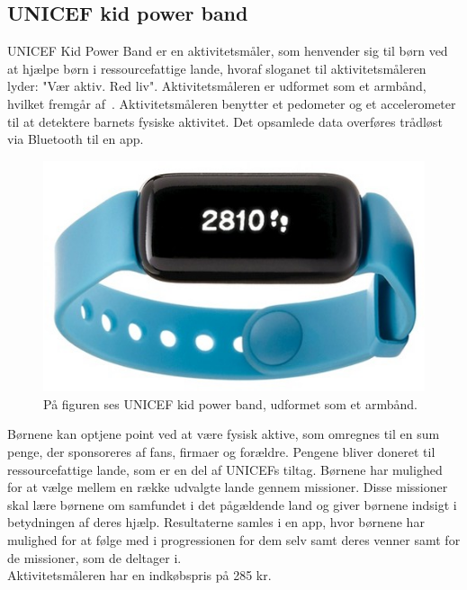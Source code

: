 \subsection{UNICEF kid power band}
UNICEF Kid Power Band er en aktivitetsmåler, som henvender sig til børn ved at hjælpe børn i ressourcefattige lande, hvoraf sloganet til aktivitetsmåleren lyder: "Vær aktiv. Red liv". Aktivitetsmåleren er udformet som et armbånd, hvilket fremgår af~. Aktivitetsmåleren benytter et pedometer og et accelerometer til at detektere barnets fysiske aktivitet. Det opsamlede data overføres trådløst via Bluetooth til en app. \citep{PowerAbout2015,PowerManual2015}
\begin{figure}[H]
	\centering
	\includegraphics[scale=0.4]{figures/aProblemanalyse/unicef.png}
	\caption{På figuren ses UNICEF kid power band, udformet som et armbånd. \cite{Unicef2016}}
	\label{fig:unicef}
\end{figure}\vspace{-.25cm}
Børnene kan optjene point ved at være fysisk aktive, som omregnes til en sum penge, der sponsoreres af fans, firmaer og forældre. Pengene bliver doneret til ressourcefattige lande, som er en del af UNICEFs tiltag. 
Børnene har mulighed for at vælge mellem en række udvalgte lande gennem missioner. Disse missioner skal lære børnene om samfundet i det pågældende land og giver børnene indsigt i betydningen af deres hjælp. Resultaterne samles i en app, hvor børnene har mulighed for at følge med i progressionen for dem selv samt deres venner samt for de missioner, som de deltager i.~\citep{PowerAbout2015,PowerManual2015}\\
Aktivitetsmåleren har en indkøbspris på 285 kr. \citep{Unicef2016}

